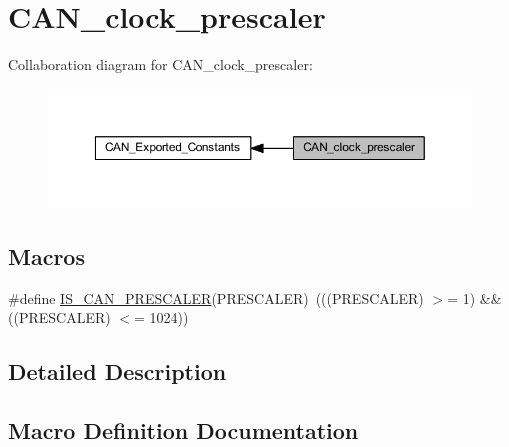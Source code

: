 \hypertarget{group___c_a_n__clock__prescaler}{}\section{C\+A\+N\+\_\+clock\+\_\+prescaler}
\label{group___c_a_n__clock__prescaler}
Collaboration diagram for C\+A\+N\+\_\+clock\+\_\+prescaler\+:
\nopagebreak
\begin{figure}[H]
\begin{center}
\leavevmode
\includegraphics[width=350pt]{group___c_a_n__clock__prescaler}
\end{center}
\end{figure}
\subsection*{Macros}
\begin{DoxyCompactItemize}
\item 
\#define \hyperlink{group___c_a_n__clock__prescaler_gacde6b8be6fe083a6302fc183b5ac1055}{I\+S\+\_\+\+C\+A\+N\+\_\+\+P\+R\+E\+S\+C\+A\+L\+ER}(P\+R\+E\+S\+C\+A\+L\+ER)~(((P\+R\+E\+S\+C\+A\+L\+ER) $>$= 1) \&\& ((P\+R\+E\+S\+C\+A\+L\+ER) $<$= 1024))
\end{DoxyCompactItemize}


\subsection{Detailed Description}


\subsection{Macro Definition Documentation}
\mbox{\label{group___c_a_n__clock__prescaler_gacde6b8be6fe083a6302fc183b5ac1055}} 
